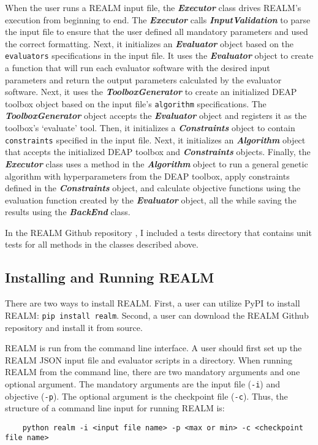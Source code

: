 When the user runs a REALM input file, the \textbf{\textit{Executor}} class 
drives REALM's execution from beginning to end.
The \textbf{\textit{Executor}} calls \textbf{\textit{InputValidation}} to 
parse the input file to ensure that the user defined all mandatory parameters
and used the correct formatting.
Next, it initializes an \textbf{\textit{Evaluator}} object based on the 
\texttt{evaluators} specifications in the input file. 
It uses the \textbf{\textit{Evaluator}} object to create a function that will 
run each evaluator software with the desired input parameters and return the 
output parameters calculated by the evaluator software. 
Next, it uses the \textbf{\textit{ToolboxGenerator}} to create an initialized 
DEAP toolbox object based on the input file's \texttt{algorithm} specifications. 
The \textbf{\textit{ToolboxGenerator}} object accepts the 
\textbf{\textit{Evaluator}} object and registers it as the toolbox's `evaluate' 
tool.  
Then, it initializes a \textbf{\textit{Constraints}} object to contain 
\texttt{constraints} specified in the input file. 
Next, it initializes an \textbf{\textit{Algorithm}} object that accepts the 
initialized DEAP toolbox and \textbf{\textit{Constraints}} objects. 
Finally, the \textbf{\textit{Executor}} class uses a method in the 
\textbf{\textit{Algorithm}} object to run a general genetic algorithm with 
hyperparameters from the DEAP toolbox, apply constraints defined in the 
\textbf{\textit{Constraints}} object, and calculate objective functions using 
the evaluation function created by the \textbf{\textit{Evaluator}} object, all 
the while saving the results using the \textbf{\textit{BackEnd}} class. 

In the REALM Github repository \cite{chee_arfcrealm_2021}, I included a tests 
directory that contains unit tests for all methods in the classes described 
above. 

\subsection{Installing and Running REALM}
There are two ways to install REALM.
First, a user can utilize \gls{PyPI} to install REALM: \texttt{pip install realm}.
Second, a user can download the REALM Github repository \cite{chee_arfcrealm_2021}
and install it from source. 

REALM is run from the command line interface. 
A user should first set up the REALM JSON input file and evaluator 
scripts in a directory. 
When running REALM from the command line, there are two mandatory arguments and 
one optional argument. 
The mandatory arguments are the input file (\texttt{-i}) and objective (\texttt{-p}). 
The optional argument is the checkpoint file (\texttt{-c}).  
Thus, the structure of a command line input for running REALM is: 
\begin{verbatim}
    python realm -i <input file name> -p <max or min> -c <checkpoint file name>
\end{verbatim} 

